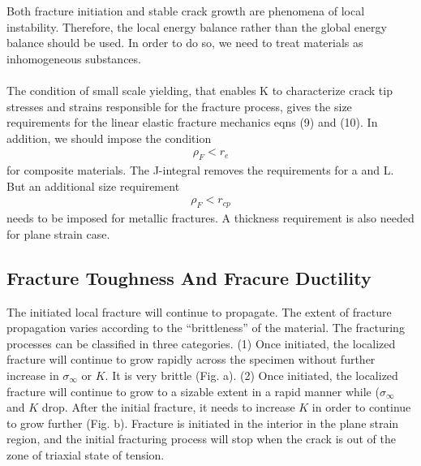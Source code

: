 \documentclass[11pt]{article}
\begin{document}
Both fracture initiation and stable crack growth are phenomena of local instability. Therefore, the
local energy balance rather than the global energy balance should be used. In order to do so, we need to
treat materials as inhomogeneous substances.
\\\\
The condition of small scale yielding, that enables K to characterize crack tip stresses and strains
responsible for the fracture process, gives the size requirements for the linear elastic fracture mechanics
eqns (9) and (10). In addition, we should impose the condition
\begin{align*}
    \rho_F < r_e \tag{11} \label{11}
\end{align*}
for composite materials. The J-integral removes the requirements for a and L. But an additional size
requirement
\begin{align*}
    \rho_F < r_{cp} \tag{12} \label{12}
\end{align*}
needs to be imposed for metallic fractures. A thickness requirement is also needed for plane strain case.
\subsection{Fracture Toughness And Fracure Ductility}
The initiated local fracture will continue to propagate. The extent of fracture propagation varies
according to the “brittleness” of the material. The fracturing processes can be classified in three
categories.
(1) Once initiated, the localized fracture will continue to grow rapidly across the specimen without
further increase in $\sigma_\infty$ or $K$. It is very brittle (Fig. a).
(2) Once initiated, the localized fracture will continue to grow to a sizable extent in a rapid manner
while ($\sigma_\infty$ and $K$ drop. After the initial fracture, it needs to increase $K$ in order to continue to grow
further (Fig. b).
Fracture is initiated in the interior in the plane strain region, and the initial fracturing process will
stop when the crack is out of the zone of triaxial state of tension.
\end{document}

